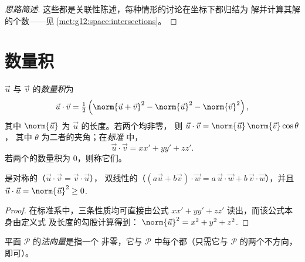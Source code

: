 \begin{proof}[思路简述]
这些都是关联性陈述，每种情形的讨论在坐标下都归结为
解并计算其解的个数——见
\cref{met:g12:space:intersections}。
\end{proof}

\section{数量积}

\begin{definition}[数量积]\label{def:g12:space:dot}
 $\vec u$ 与 $\vec v$ 的\emph{数量积}为
\[
\vec u \cdot \vec v = \tfrac12\left(\norm{\vec u + \vec v}^2
- \norm{\vec u}^2 - \norm{\vec v}^2\right),
\]
其中 $\norm{\vec u}$ 为 $\vec u$ 的长度。若两个均非零，
则 $\vec u \cdot \vec v = \norm{\vec u}\,\norm{\vec v}\cos\theta$，
其中 $\theta$ 为二者的夹角；在\emph{标准}
中，
\[
\vec u \cdot \vec v = xx' + yy' + zz' .
\]
若两个的数量积为 $0$，则称它们\emph{}。
\end{definition}

\begin{proposition}[性质]\label{prop:g12:space:dotprops}
是对称的（$\vec u\cdot\vec v = \vec v\cdot\vec u$），
双线性的（$(a\vec u + b\vec v)\cdot \vec w = a\,\vec u\cdot\vec w +
b\,\vec v\cdot \vec w$），并且
$\vec u \cdot \vec u = \norm{\vec u}^2 \geq 0$.
\end{proposition}

\begin{proof}
在标准系中，三条性质均可直接由公式
$xx' + yy' + zz'$ 读出，而该公式本身由定义式
及长度的勾股计算得到：
$\norm{\vec u}^2 = x^2 + y^2 + z^2$.
\end{proof}

\begin{definition}[法向量]\label{def:g12:space:normal}
平面 $\mathcal P$ 的\emph{法向量}是指一个
非零，它与 $\mathcal P$ 中每个都（只需它与
$\mathcal P$ 的两个不方向，
即可）。
\end{definition}


